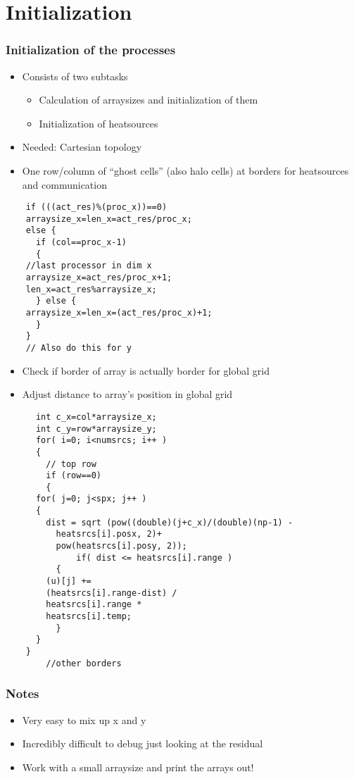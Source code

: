 \section{Initialization}
\begin{frame}
  \frametitle{Initialization of the processes}
  \begin{itemize}
  \item Consists of two subtasks
    \begin{itemize}
    \item Calculation of arraysizes and initialization of them
    \item Initialization of heatsources
    \end{itemize}
    \item Needed: Cartesian topology
    \item One row/column of ``ghost cells'' (also halo cells) at borders for heatsources and communication
  \end{itemize}
\end{frame}


\begin{frame}[fragile]
  \begin{lstlisting}
    if (((act_res)%(proc_x))==0)
    arraysize_x=len_x=act_res/proc_x;
    else {
      if (col==proc_x-1)
      {
	//last processor in dim x
	arraysize_x=act_res/proc_x+1;
	len_x=act_res%arraysize_x;
      } else {
	arraysize_x=len_x=(act_res/proc_x)+1; 
      }
    }    
    // Also do this for y
  \end{lstlisting}


\end{frame}



\begin{frame}
  \begin{itemize}
  \item Check if border of array is actually border for global grid
    \item Adjust distance to array's position in global grid
  \end{itemize}
\end{frame}




\begin{frame}[fragile]
  \begin{lstlisting}
      int c_x=col*arraysize_x;
      int c_y=row*arraysize_y;
      for( i=0; i<numsrcs; i++ )
      {
        // top row 
        if (row==0)
        {
	  for( j=0; j<spx; j++ ) 
	  { 
	    dist = sqrt (pow((double)(j+c_x)/(double)(np-1) -
	      heatsrcs[i].posx, 2)+
	      pow(heatsrcs[i].posy, 2));
              if( dist <= heatsrcs[i].range )
	      {
		(u)[j] += 
		(heatsrcs[i].range-dist) /
		heatsrcs[i].range *
		heatsrcs[i].temp;
	      }
	  }
	}
        //other borders
  \end{lstlisting}
\end{frame}

\begin{frame}
  \frametitle{Notes}
  \begin{itemize}
  \item Very easy to mix up x and y
  \item Incredibly difficult to debug just looking at the residual
  \item Work with a small arraysize and print the arrays out!
  \end{itemize}
\end{frame}
